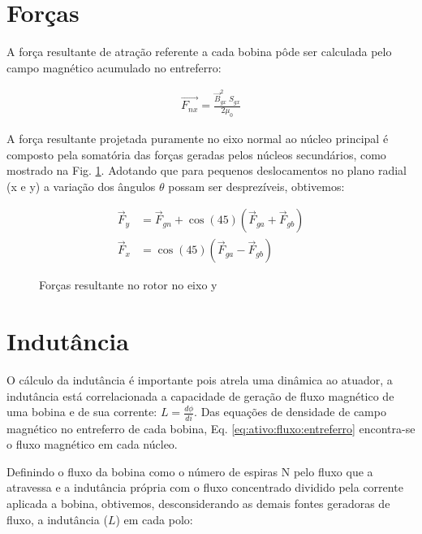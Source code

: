 \section{Forças}

A força resultante de atração referente a cada bobina pôde ser calculada pelo campo magnético acumulado no entreferro:

\begin{align}
	\vec{F_{nx}} = \frac{\vec{B}_{gx}^2 \; S_{gx}}{2 \mu_0} 
\end{align}

A força resultante projetada puramente no eixo normal ao núcleo principal é composto pela somatória das forças geradas pelos núcleos secundários, como mostrado na Fig. \ref{Fig:modelo:circuito:ativo:forcas}. Adotando que para pequenos deslocamentos no plano radial (x e y) a variação dos ângulos $\theta$ possam ser desprezíveis, obtivemos:

\begin{align}
\vec{F}_y &= \vec{F}_{gn} + \cos(45) (\vec{F}_{ga} + \vec{F}_{gb}) \label{eq:ativo:F:resultante:y} \\
\vec{F}_x &= \cos(45) (\vec{F}_{ga} - \vec{F}_{gb})  \label{eq:ativo:F:resultante:x}
\end{align}

\begin{figure}[!ht]
	\centering
	\def\svgwidth{0.8\columnwidth}
	
		\caption{Forças resultante no rotor no eixo y}
		\label{Fig:modelo:circuito:ativo:forcas}
\end{figure} 


\section{Indutância} \label{subsec:at:indutancia}

O cálculo da indutância é importante pois atrela uma dinâmica ao atuador, a indutância está correlacionada a capacidade de geração de fluxo magnético de uma bobina e de sua corrente: $L = \frac {d\phi}{di}$. Das equações de densidade de campo magnético no entreferro de cada bobina, Eq. \eqref{eq:ativo:fluxo:entreferro} encontra-se o fluxo magnético em cada núcleo.

Definindo o fluxo da bobina como o número de espiras N pelo fluxo que a atravessa e a indutância própria com o fluxo concentrado dividido pela corrente aplicada a bobina, obtivemos, desconsiderando as demais fontes geradoras de fluxo, a indutância ($L$) em cada polo:

